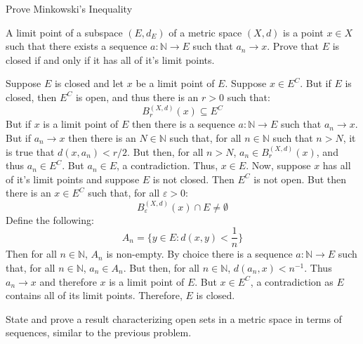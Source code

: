 \documentclass[crop=false,class=article,oneside]{standalone}
\begin{document}
    \begin{problem}
        Prove Minkowski's Inequality
    \end{problem}
    \begin{problem}
        A limit point of a subspace $(E,d_{E})$ of a metric
        space $(X,d)$ is a point $x\in{X}$ such that there
        exists a sequence $a:\mathbb{N}\rightarrow{E}$ such
        that $a_{n}\rightarrow{x}$. Prove that $E$ is closed
        if and only if it has all of it's limit points.
    \end{problem}
    \begin{solution}
        Suppose $E$ is closed and let $x$ be a limit point
        of $E$. Suppose $x\in{E}^{C}$. But if $E$ is closed,
        then $E^{C}$ is open, and thus there is an $r>0$
        such that:
        \begin{equation}
            B_{r}^{(X,d)}(x)\subseteq{E}^{C}
        \end{equation}
        But if $x$ is a limit point of $E$ then there is a
        sequence $a:\mathbb{N}\rightarrow{E}$ such that
        $a_{n}\rightarrow{x}$. But if $a_{n}\rightarrow{x}$ then
        there is an $N\in\mathbb{N}$ such that, for all $n\in\mathbb{N}$
        such that $n>N$, it is true that $d(x,a_{n})<r/2$. But then,
        for all $n>N$, $a_{n}\in{B}_{r}^{(X,d)}(x)$, and thus
        $a_{n}\in{E}^{C}$. But $a_{n}\in{E}$, a contradiction. Thus,
        $x\in{E}$. Now, suppose $x$ has all of it's limit points and
        suppose $E$ is not closed. Then $E^{C}$ is not open. But then
        there is an $x\in{E}^{C}$ such that, for all $\varepsilon>0$:
        \begin{equation}
            B_{\varepsilon}^{(X,d)}(x)\cap{E}\ne\emptyset
        \end{equation}
        Define the following:
        \begin{equation}
            A_{n}=\Big\{y\in{E}:d(x,y)<\frac{1}{n}\Big\}
        \end{equation}
        Then for all $n\in\mathbb{N}$, $A_{n}$ is non-empty.
        By choice there is a sequence $a:\mathbb{N}\rightarrow{E}$ such
        that, for all $n\in\mathbb{N}$, $a_{n}\in{A}_{n}$. But then,
        for all $n\in\mathbb{N}$, $d(a_{n},x)<n^{\minus{1}}$. Thus
        $a_{n}\rightarrow{x}$ and therefore $x$ is a limit point of $E$.
        But $x\in{E}^{C}$, a contradiction as $E$ contains all of its
        limit points. Therefore, $E$ is closed.
    \end{solution}
    \begin{problem}
        State and prove a result characterizing open sets in a metric
        space in terms of sequences, similar to the previous problem.
    \end{problem}
\end{document}
